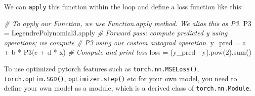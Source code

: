 \documentclass[
]{article}
\newenvironment{Shaded}{}{}
\newcommand{\BuiltInTok}[1]{\textcolor[rgb]{0.00,0.50,0.00}{#1}}
\newcommand{\CommentTok}[1]{\textcolor[rgb]{0.38,0.63,0.69}{\textit{#1}}}
\newcommand{\DecValTok}[1]{\textcolor[rgb]{0.25,0.63,0.44}{#1}}
\newcommand{\NormalTok}[1]{#1}
\newcommand{\OperatorTok}[1]{\textcolor[rgb]{0.40,0.40,0.40}{#1}}
\newcommand{\1}{\boldsymbol{1}}
\begin{document}
We can \texttt{apply} this function within the loop and define a loss
function like this:

\begin{Shaded}
\begin{Highlighting}[]
\CommentTok{\# To apply our Function, we use Function.apply method. We alias this as \textquotesingle{}P3\textquotesingle{}.}
\NormalTok{P3 }\OperatorTok{=}\NormalTok{ LegendrePolynomial3.}\BuiltInTok{apply}
\CommentTok{\# Forward pass: compute predicted y using operations; we compute}
\CommentTok{\# P3 using our custom autograd operation.}
\NormalTok{y\_pred }\OperatorTok{=}\NormalTok{ a }\OperatorTok{+}\NormalTok{ b }\OperatorTok{*}\NormalTok{ P3(c }\OperatorTok{+}\NormalTok{ d }\OperatorTok{*}\NormalTok{ x)}
\CommentTok{\# Compute and print loss}
\NormalTok{loss }\OperatorTok{=}\NormalTok{ (y\_pred }\OperatorTok{{-}}\NormalTok{ y).}\BuiltInTok{pow}\NormalTok{(}\DecValTok{2}\NormalTok{).}\BuiltInTok{sum}\NormalTok{()}
\end{Highlighting}
\end{Shaded}

To use optimized pytorch features such as \texttt{torch.nn.MSELoss()},
\texttt{torch.optim.SGD()}, \texttt{optimizer.step()} etc for your own
model, you need to define your own model as a module, which is a derived
class of \texttt{torch.nn.Module}.
\end{document}

